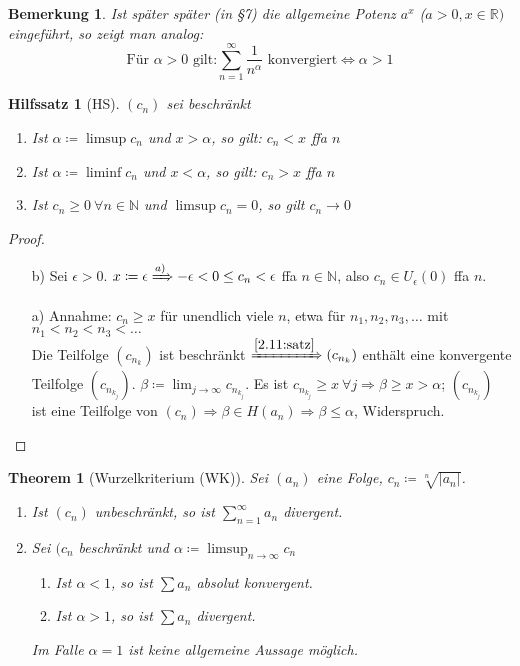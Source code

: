 \documentclass{extreport}
\newcommand{\N}{\mathbb{N}}
\newcommand{\R}{\mathbb{R}}
\theoremstyle{named}
\newtheorem{namedtheorem}{Theorem} \counterwithin{namedtheorem}{chapter}
\theoremstyle{dotless}
\newtheorem*{bemerkung}{Bemerkung}
\newtheorem*{hilfssatz*}{Hilfssatz}
\begin{document}
\begin{bemerkung}
	Ist später später (in \S 7) die allgemeine Potenz $a^{x}$ ($a > 0, x \in \R)$ eingeführt, so zeigt man analog:
	$$ \text{Für } \alpha > 0 \text{ gilt:} \sum_{n=1}^{\infty} \frac{1}{n^{\alpha}} \text{ konvergiert} \iff \alpha > 1 $$
\end{bemerkung}


\begin{hilfssatz*}[HS]
	$(c_{n})$ sei beschränkt
	\begin{enumerate}
		\item Ist $\alpha \coloneqq \limsup c_{n}$ und $x > \alpha$, so gilt: $c_{n} < x$ ffa $n$
		\item Ist $\alpha \coloneqq \liminf c_{n}$ und $x < \alpha$, so gilt: $c_{n} > x$ ffa $n$
		\item Ist $c_{n} \geq 0 ~\forall n \in \N$ und $\limsup c_{n} = 0$, so gilt $c_{n} \rightarrow 0$
	\end{enumerate}
\end{hilfssatz*}

\begin{proof} ~\
	\begin{enumerate}
		\item[b)] Sei $\epsilon > 0$. $x \coloneqq \epsilon \xRightarrow[]{a)} -\epsilon < 0 \leq c_{n} < \epsilon$ ffa $n \in \N$, also $c_{n} \in U_{\epsilon}(0)$ ffa $n$.
		\item[a)] Annahme: $c_{n} \geq x$ für unendlich viele $n$, etwa für $n_{1}, n_{2}, n_{3}, \dotsc$ mit $n_{1} < n_{2} < n_{3} < \dotsc$ \\
		 Die Teilfolge $(c_{n_{k}})$ ist beschränkt $\xRightarrow[]{\ref{2.11:satz}} (c_{n_{k}})$ enthält eine konvergente Teilfolge $(c_{n_{k_{j}}})$. $\beta \coloneqq \lim_{j\rightarrow \infty} c_{n_{k_{j}}}$. Es ist $c_{n_{k_{j}}} \geq x ~\forall j \Rightarrow \beta \geq x > \alpha$; $(c_{n_{k_{j}}})$ ist eine Teilfolge von $(c_{n}) \Rightarrow \beta \in H(a_{n}) \Rightarrow \beta \leq \alpha$, Widerspruch.
	\end{enumerate}	
\end{proof}

\begin{namedtheorem}[Wurzelkriterium (WK)] \label{3.6:prop-Wurzelkriterium}
	Sei $(a_{n})$ eine Folge, $c_{n} \coloneqq \sqrt[n]{|a_{n}|}$.
	\begin{enumerate}
		\item Ist $(c_{n})$ unbeschränkt, so ist $\sum_{n=1}^{\infty} a_{n}$ divergent.
		\item Sei $(c_{n}$ beschränkt und $\alpha \coloneqq \limsup_{n \rightarrow \infty} c_{n}$
			\begin{enumerate}
				\item Ist $\alpha < 1$, so ist $\sum a_{n}$ absolut konvergent.
				\item Ist $\alpha > 1$, so ist $\sum a_{n}$ divergent.
			\end{enumerate}
			Im Falle $\alpha = 1$ ist keine allgemeine Aussage möglich.
	\end{enumerate}
\end{namedtheorem}
\end{document}
